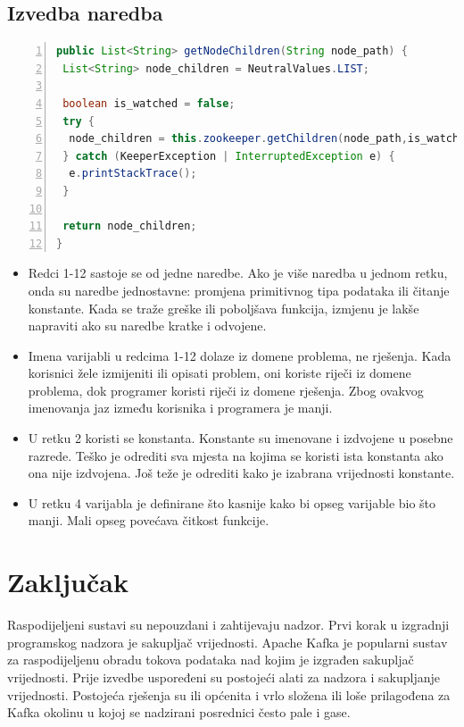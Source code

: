 \documentclass[utf8, diplomski, lmodern, numeric]{fer}
\begin{document}
\section{Izvedba naredba}

\begin{lstlisting}[floatplacement=H, language=Java, caption={Izvadak iz razreda Kafka ZooKeeper}, captionpos=b, basicstyle=\footnotesize, numbers=left, stepnumber=1, backgroundcolor=\color{backcolour}, keywordstyle=\color{blue}]
public List<String> getNodeChildren(String node_path) {
 List<String> node_children = NeutralValues.LIST;
 
 boolean is_watched = false;
 try {
  node_children = this.zookeeper.getChildren(node_path,is_watched);
 } catch (KeeperException | InterruptedException e) {
  e.printStackTrace();
 }

 return node_children;
}
\end{lstlisting}

\begin{itemize}
    \item Redci 1-12 sastoje se od jedne naredbe. Ako je više naredba u jednom retku, onda su naredbe jednostavne: promjena primitivnog tipa podataka ili čitanje konstante. Kada se traže greške ili poboljšava funkcija, izmjenu je lakše napraviti ako su naredbe kratke i odvojene.
    \item Imena varijabli u redcima 1-12 dolaze iz domene problema, ne rješenja. Kada korisnici žele izmijeniti ili opisati problem, oni koriste riječi iz domene problema, dok programer koristi riječi iz domene rješenja. Zbog ovakvog imenovanja jaz između korisnika i programera je manji.
    \item U retku 2 koristi se konstanta. Konstante su imenovane i izdvojene u posebne razrede. Teško je odrediti sva mjesta na kojima se koristi ista konstanta ako ona nije izdvojena. Još teže je odrediti kako je izabrana vrijednosti konstante.
    \item U retku 4 varijabla je definirane što kasnije kako bi opseg varijable bio što manji. Mali opseg povećava čitkost funkcije.
\end{itemize}



\chapter{Zaključak}

Raspodijeljeni sustavi su nepouzdani i zahtijevaju nadzor. Prvi korak u izgradnji programskog nadzora je sakupljač vrijednosti. Apache Kafka je popularni sustav za raspodijeljenu obradu tokova podataka nad kojim je izgrađen sakupljač vrijednosti. Prije izvedbe uspoređeni su postojeći alati za nadzora i sakupljanje vrijednosti. Postojeća rješenja su ili općenita i vrlo složena ili loše prilagođena za Kafka okolinu u kojoj se nadzirani posrednici često pale i gase.
\end{document}
